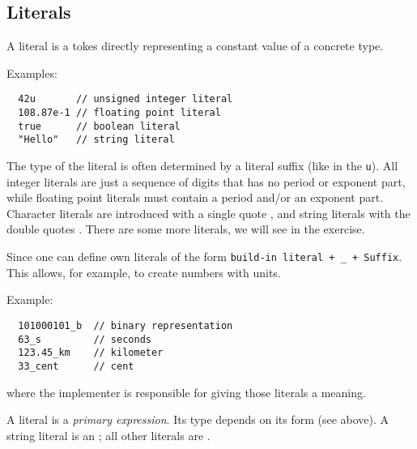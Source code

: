 \subsection{Literals\label{sec:literal}}
A literal is a tokes directly representing a constant value of a concrete type.

Examples:
\begin{verbatim}
  42u       // unsigned integer literal
  108.87e-1 // floating point literal
  true      // boolean literal
  "Hello"   // string literal
\end{verbatim}

The type of the literal is often determined by a literal suffix (like in  the \texttt{u}). All integer literals are just a
sequence of digits that has no period or exponent part, while floating point literals must contain a period and/or an exponent part.
Character literals are introduced with a single quote , and string literals with the double quotes . There are
some more literals, we will see in the exercise.

\begin{rem}
  Since\marginpar{[\cxx11]}  one can define own literals of the form \texttt{build-in literal + \_ + Suffix}. This allows, for example, to create
  numbers with units.

Example:
\begin{verbatim}
  101000101_b  // binary representation
  63_s         // seconds
  123.45_km    // kilometer
  33_cent      // cent
\end{verbatim}

where the implementer is responsible for giving those literals a meaning.
\end{rem}

\begin{rem}
  A literal is a \textit{primary expression}. Its type depends on its form (see above). A string literal is an ; all other
  literals are .
\end{rem}


